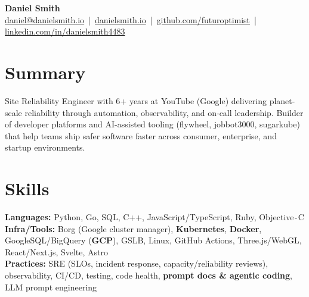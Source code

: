 \documentclass[10pt]{article}
\begin{document}
\begin{center}
    {\LARGE \textbf{Daniel Smith}}\\[-1mm]
    \href{mailto:daniel@danielsmith.io}{daniel@danielsmith.io} \,|\,
    \href{https://danielsmith.io}{danielsmith.io} \,|\,
    \href{https://github.com/futuroptimist}{github.com/futuroptimist} \,|\,
    \href{https://linkedin.com/in/danielsmith4483}{linkedin.com/in/danielsmith4483}
\end{center}

\vspace{-2mm}
\section*{Summary}
Site Reliability Engineer with 6+ years at YouTube (Google) delivering planet-scale reliability
through automation, observability, and on-call leadership. Builder of developer platforms and
AI-assisted tooling (flywheel, jobbot3000, sugarkube) that help teams ship safer software faster
across consumer, enterprise, and startup environments.

\vspace{-2mm}
\section*{Skills}
\textbf{Languages:} Python, Go, SQL, C++, JavaScript/TypeScript, Ruby, Objective\texttt{-}C \\
\textbf{Infra/Tools:} Borg (Google cluster manager), \textbf{Kubernetes}, \textbf{Docker}, GoogleSQL/BigQuery (\textbf{GCP}), GSLB, Linux, GitHub Actions, Three.js/WebGL, React/Next.js, Svelte, Astro \\
\textbf{Practices:} SRE (SLOs, incident response, capacity/reliability reviews), observability, CI/CD, testing, code health, \textbf{prompt docs \& agentic coding}, LLM prompt engineering

\vspace{-2mm}
\end{document}
